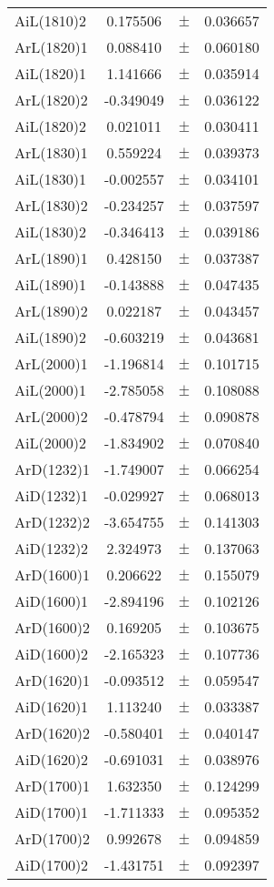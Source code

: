 \begin{table}
\begin{tiny}
\begin{tabular}{lccc}
AiL(1810)2 & 0.175506 & $\pm$ & 0.036657 \\
ArL(1820)1 & 0.088410 & $\pm$ & 0.060180 \\
AiL(1820)1 & 1.141666 & $\pm$ & 0.035914 \\
ArL(1820)2 & -0.349049 & $\pm$ & 0.036122 \\
AiL(1820)2 & 0.021011 & $\pm$ & 0.030411 \\
ArL(1830)1 & 0.559224 & $\pm$ & 0.039373 \\
AiL(1830)1 & -0.002557 & $\pm$ & 0.034101 \\
ArL(1830)2 & -0.234257 & $\pm$ & 0.037597 \\
AiL(1830)2 & -0.346413 & $\pm$ & 0.039186 \\
ArL(1890)1 & 0.428150 & $\pm$ & 0.037387 \\
AiL(1890)1 & -0.143888 & $\pm$ & 0.047435 \\
ArL(1890)2 & 0.022187 & $\pm$ & 0.043457 \\
AiL(1890)2 & -0.603219 & $\pm$ & 0.043681 \\
ArL(2000)1 & -1.196814 & $\pm$ & 0.101715 \\
AiL(2000)1 & -2.785058 & $\pm$ & 0.108088 \\
ArL(2000)2 & -0.478794 & $\pm$ & 0.090878 \\
AiL(2000)2 & -1.834902 & $\pm$ & 0.070840 \\
ArD(1232)1 & -1.749007 & $\pm$ & 0.066254 \\
AiD(1232)1 & -0.029927 & $\pm$ & 0.068013 \\
ArD(1232)2 & -3.654755 & $\pm$ & 0.141303 \\
AiD(1232)2 & 2.324973 & $\pm$ & 0.137063 \\
ArD(1600)1 & 0.206622 & $\pm$ & 0.155079 \\
AiD(1600)1 & -2.894196 & $\pm$ & 0.102126 \\
ArD(1600)2 & 0.169205 & $\pm$ & 0.103675 \\
AiD(1600)2 & -2.165323 & $\pm$ & 0.107736 \\
ArD(1620)1 & -0.093512 & $\pm$ & 0.059547 \\
AiD(1620)1 & 1.113240 & $\pm$ & 0.033387 \\
ArD(1620)2 & -0.580401 & $\pm$ & 0.040147 \\
AiD(1620)2 & -0.691031 & $\pm$ & 0.038976 \\
ArD(1700)1 & 1.632350 & $\pm$ & 0.124299 \\
AiD(1700)1 & -1.711333 & $\pm$ & 0.095352 \\
ArD(1700)2 & 0.992678 & $\pm$ & 0.094859 \\
AiD(1700)2 & -1.431751 & $\pm$ & 0.092397 \\
\bottomrule
\end{tabular}
\end{tiny}
\end{table}

